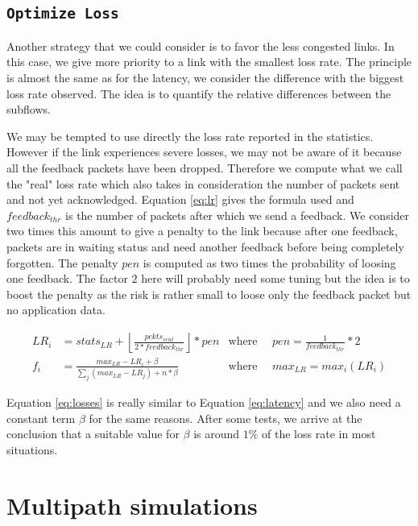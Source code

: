\subsection{\texttt{Optimize Loss}}

Another strategy that we could consider is to favor the less congested links. In this case, we give more priority to a link with the smallest loss rate. The principle is almost the same as for the latency, we consider the difference with the biggest loss rate observed. The idea is to quantify the relative differences between the subflows.

We may be tempted to use directly the loss rate reported in the statistics. However if the link experiences severe losses, we may not be aware of it because all the feedback packets have been dropped. Therefore we compute what we call the "real" loss rate which also takes in consideration the number of packets sent and not yet acknowledged. Equation \ref{eq:lr} gives the formula used and $feedback_{thr}$ is the number of packets after which we send a feedback. We consider two times this amount to give a penalty to the link because after one feedback, packets are in waiting status and need another feedback before being completely forgotten. The penalty $pen$ is computed as two times the probability of loosing one feedback. The factor $2$ here will probably need some tuning but the idea is to boost the penalty as the risk is rather small to loose only the feedback packet but no application data. 

\begin{align}
LR_i &= stats_{LR} + \left \lfloor{\frac{pckts_{sent}}{2 * feedback_{thr}}} \right \rfloor  * pen & \text{where } \quad pen = \frac{1}{feedback_{thr}} * 2 \label{eq:lr} \\
f_i &= \frac{max_{LR} - LR_i + \beta}{\sum_j (max_{LR} - LR_j) + n*\beta } & \text{where } \quad max_{LR} = max_i(LR_i) 
\label{eq:losses}
\end{align}

Equation \ref{eq:losses} is really similar to Equation \ref{eq:latency} and we also need a constant term $\beta$ for the same reasons. After some tests, we arrive at the conclusion that a suitable value for $\beta$ is around $1\%$  of the loss rate in most situations.

\section{Multipath simulations}

